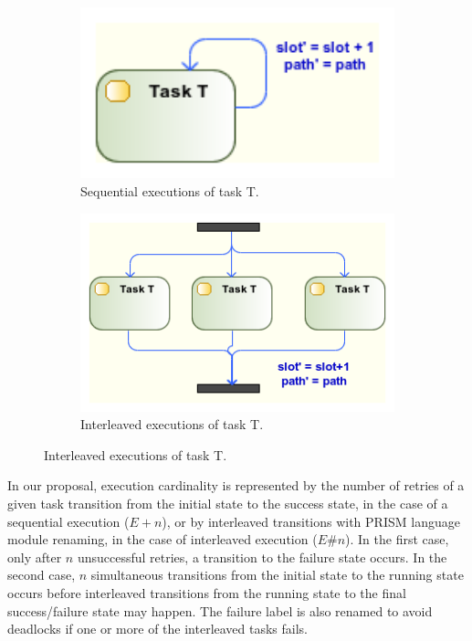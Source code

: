 \begin{figure}[ht!]
        \centering
        \begin{subfigure}[b]{0.3\textwidth}
                \includegraphics[width=1\textwidth]{imgs/UML_MUL_SEQ_TSKS.png}
				\caption{Sequential executions of task T.}
				\label{fig:UML_MUL_SEQ_TSKS}
        \end{subfigure}        
        \quad %
        \begin{subfigure}[b]{0.4\textwidth}                
                \includegraphics[width=1\textwidth]{imgs/UML_MUL_PAR_TSKS.png}
				\caption{Interleaved executions of task T.}
				\label{fig:UML_MUL_PAR_TSKS}
        \end{subfigure}%
          
\end{figure}

In our proposal, execution cardinality is represented by the number of retries of a given task transition from the initial state to the success state, in the case of a sequential execution ($E+n$), or by interleaved transitions with PRISM language module renaming, in the case of interleaved execution ($E\#n$). In the first case, only after $n$ unsuccessful retries, a transition to the failure state occurs. In the second case, $n$ simultaneous transitions from the initial state to the running state occurs before interleaved transitions from the running state to the final success/failure state may happen. The failure label is also renamed to avoid deadlocks if one or more of the interleaved tasks fails.

